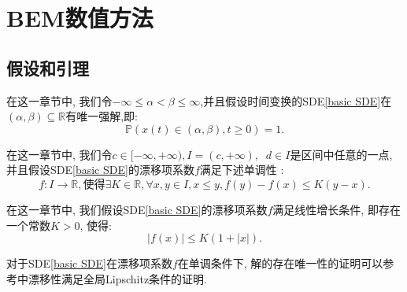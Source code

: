 

\chapter{BEM数值方法}

\section{假设和引理}

\begin{assumption}\label{unique}
	在这一章节中, 我们令$-\infty\leq\alpha<\beta\leq\infty$,并且假设时间变换的SDE\cref{basic SDE}在$(\alpha,\beta)\subseteq\mathbb{R}$有唯一强解,即:$$\mathbb{P}(x(t)\in(\alpha,\beta), t\geq0)=1.$$
\end{assumption}
\begin{assumption}\label{monotony}
	在这一章节中, 我们令$c\in[-\infty,+\infty),I=(c,+\infty),\operatorname{}d\in I$是区间中任意的一点, 并且假设SDE\cref{basic SDE}的漂移项系数$f$满足下述单调性 :
	\begin{equation}
		f:I\to\mathbb{R}  , 使得 \exists K \in\mathbb{R},\forall x,y\in I,x\leq y,f(y)-f(x)\leq K(y-x).
	\end{equation}
\end{assumption}

\begin{assumption}\label{super linear growth}
	在这一章节中, 我们假设SDE\cref{basic SDE}的漂移项系数$f$满足线性增长条件, 即存在一个常数$K>0$, 使得:
	\begin{equation}
		|f(x)| \le K(1+|x|). 
	\end{equation}
\end{assumption}
对于SDE\cref{basic SDE}在漂移项系数$f$在单调条件下, 解的存在唯一性的证明可以参考\cite{umarov2018beyond}中漂移性满足全局Lipschitz条件的证明.
